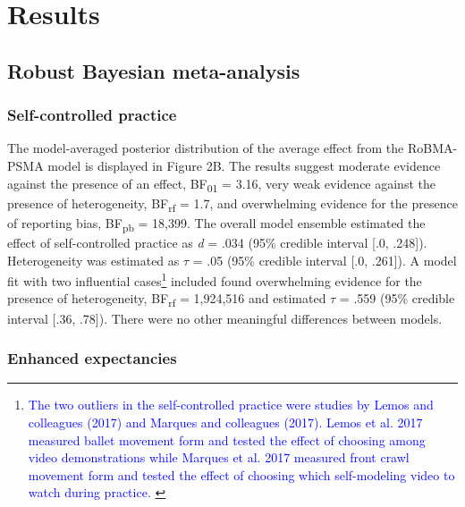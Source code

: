 \documentclass[
  man, donotrepeattitle,mask,floatsintext]{apa7}
\begin{document}
\hypertarget{results}{%
\section{Results}\label{results}}

\hypertarget{robust-bayesian-meta-analysis-1}{%
\subsection{Robust Bayesian meta-analysis}\label{robust-bayesian-meta-analysis-1}}

\hypertarget{self-controlled-practice}{%
\subsubsection{Self-controlled practice}\label{self-controlled-practice}}

The model-averaged posterior distribution of the average effect from the RoBMA-PSMA model is displayed in Figure 2B. The results suggest moderate evidence against the presence of an effect, BF\textsubscript{01} = 3.16, very weak evidence against the presence of heterogeneity, BF\textsubscript{rf} = 1.7, and overwhelming evidence for the presence of reporting bias, BF\textsubscript{pb} = 18,399. The overall model ensemble estimated the effect of self-controlled practice as \emph{d} = .034 (95\% credible interval {[}.0, .248{]}). Heterogeneity was estimated as \(\tau\) = .05 (95\% credible interval {[}.0, .261{]}). A model fit with two influential cases\footnote{\textcolor{blue}{The two outliers in the self-controlled practice were studies by Lemos and colleagues (2017) and Marques and colleagues (2017). Lemos et al. 2017 measured ballet movement form and tested the effect of choosing among video demonstrations while Marques et al. 2017 measured front crawl movement form and tested the effect of choosing which self-modeling video to watch during practice.
  }} included found overwhelming evidence for the presence of heterogeneity, BF\textsubscript{rf} = 1,924,516 and estimated \(\tau\) = .559 (95\% credible interval {[}.36, .78{]}). There were no other meaningful differences between models.

\hypertarget{enhanced-expectancies}{%
\subsubsection{Enhanced expectancies}\label{enhanced-expectancies}}
\end{document}

